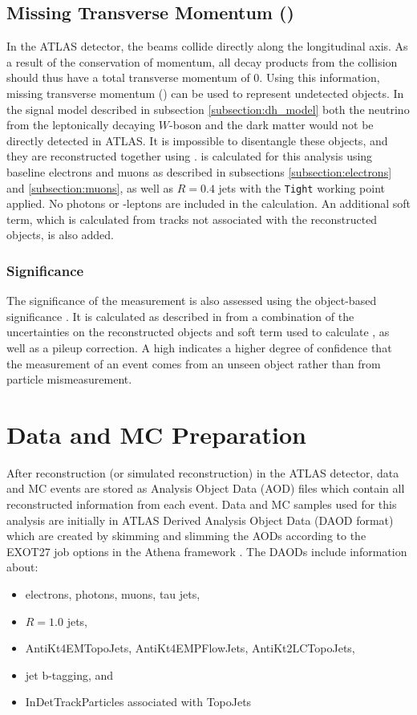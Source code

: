 \subsection{Missing Transverse Momentum (\met)}
In the ATLAS detector, the beams collide directly along the longitudinal axis. As a result of the conservation of momentum, all decay products from the collision should thus have a total transverse momentum of 0. Using this information, missing transverse momentum (\met) can be used to represent undetected objects. In the signal model described in subsection \ref{subsection:dh_model} both the neutrino from the leptonically decaying $W$-boson and the dark matter would not be directly detected in ATLAS. It is impossible to disentangle these objects, and they are reconstructed together using \met. \met is calculated for this analysis using baseline electrons and muons as described in subsections \ref{subsection:electrons} and \ref{subsection:muons}, as well as $R=0.4$ jets with the \verb|Tight| working point applied. No photons or \tau-leptons are included in the calculation. An additional soft term, which is calculated from tracks not associated with the reconstructed objects, is also added.

\subsubsection{\met Significance}
The significance of the \met measurement is also assessed using the object-based \met significance \metsig. It is calculated as described in \cite{MetSig} from a combination of the uncertainties on the reconstructed objects and soft term used to calculate \met, as well as a pileup correction. A high \metsig indicates a higher degree of confidence that the \met measurement of an event comes from an unseen object rather than from particle mismeasurement.

\section{Data and MC Preparation}
After reconstruction (or simulated reconstruction) in the ATLAS detector, data and MC events are stored as Analysis Object Data (AOD) files which contain all reconstructed information from each event. Data and MC samples used for this analysis are initially in ATLAS Derived Analysis Object Data (DAOD format) which are created by skimming and slimming the AODs according to the EXOT27 job options in the Athena framework \cite{Athena}. The DAODs include information about:
\begin{itemize}
	\item electrons, photons, muons, tau jets,
	\item $R=1.0$ jets,
	\item AntiKt4EMTopoJets, AntiKt4EMPFlowJets, AntiKt2LCTopoJets,
  \item jet b-tagging, and
	\item InDetTrackParticles associated with TopoJets
\end{itemize}

